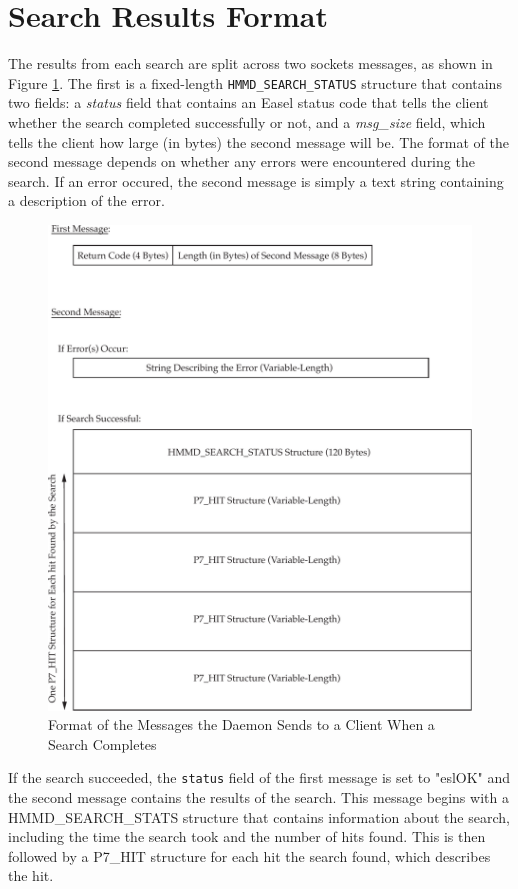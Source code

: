 \documentclass[notoc,justified]{tufte-book}    %
\begin{document}
\section{Search Results Format}
The results from each search are split across two sockets messages, as shown in Figure \ref{fig:search-results}.  The first is a fixed-length {\tt HMMD\_SEARCH\_STATUS} structure that contains two fields: a {\em status} field that contains an Easel status code that tells the client whether the search completed successfully or not, and a {\em msg\_size} field, which tells the client how large (in bytes) the second message will be.  The format of the second message depends on whether any errors were encountered during the search.  If an error occured, the second message is simply a text string containing a description of the error.  


\begin{figure}
\includegraphics[width=\textwidth]{inclusions/daemon-results.pdf}
\caption{Format of the Messages the Daemon Sends to a Client When a Search Completes}
\label{fig:search-results}
\end{figure}

If the search succeeded, the {\tt status} field of the first message is set to "eslOK" and the second message contains the results of the search.  This message begins with a {HMMD\_SEARCH\_STATS} structure that contains information about the search, including the time the search took and the number of hits found.  This is then followed by a {P7\_HIT} structure for each hit the search found, which describes the hit.
\end{document}
